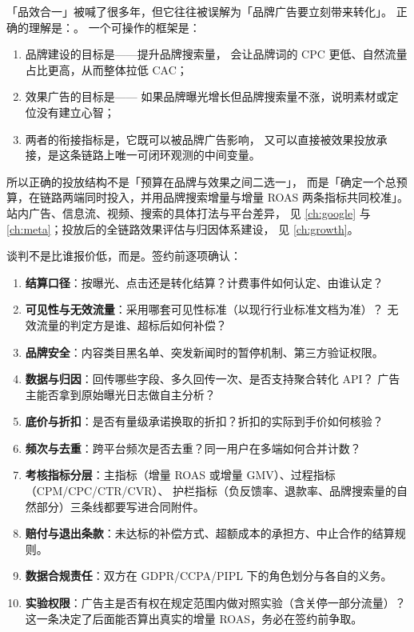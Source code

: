 \begin{insight}[品效协同的真实含义]
「品效合一」被喊了很多年，但它往往被误解为「品牌广告要立刻带来转化」。
正确的理解是：。
一个可操作的框架是：
\begin{enumerate}
  \item 品牌建设的目标是——提升品牌搜索量，
        会让品牌词的 CPC 更低、自然流量占比更高，从而整体拉低 CAC；
  \item 效果广告的目标是——
        如果品牌曝光增长但品牌搜索量不涨，说明素材或定位没有建立心智；
  \item 两者的衔接指标是，它既可以被品牌广告影响，
        又可以直接被效果投放承接，是这条链路上唯一可闭环观测的中间变量。
\end{enumerate}
所以正确的投放结构不是「预算在品牌与效果之间二选一」，
而是「确定一个总预算，在链路两端同时投入，并用品牌搜索增量与增量 ROAS 两条指标共同校准」。
站内广告、信息流、视频、搜索的具体打法与平台差异，
见 \cref{ch:google} 与 \cref{ch:meta}；投放后的全链路效果评估与归因体系建设，
见 \cref{ch:growth}。
\end{insight}

\begin{toolbox}[媒体采购的谈判与考核指标清单]
谈判不是比谁报价低，而是。签约前逐项确认：
\begin{enumerate}
  \item \textbf{结算口径}：按曝光、点击还是转化结算？计费事件如何认定、由谁认定？
  \item \textbf{可见性与无效流量}：采用哪套可见性标准（以现行行业标准文档为准）？
        无效流量的判定方是谁、超标后如何补偿？
  \item \textbf{品牌安全}：内容类目黑名单、突发新闻时的暂停机制、第三方验证权限。
  \item \textbf{数据与归因}：回传哪些字段、多久回传一次、是否支持聚合转化 API？
        广告主能否拿到原始曝光日志做自主分析？
  \item \textbf{底价与折扣}：是否有量级承诺换取的折扣？折扣的实际到手价如何核验？
  \item \textbf{频次与去重}：跨平台频次是否去重？同一用户在多端如何合并计数？
  \item \textbf{考核指标分层}：主指标（增量 ROAS 或增量 GMV）、过程指标（CPM/CPC/CTR/CVR）、
        护栏指标（负反馈率、退款率、品牌搜索量的自然部分）三条线都要写进合同附件。
  \item \textbf{赔付与退出条款}：未达标的补偿方式、超额成本的承担方、中止合作的结算规则。
  \item \textbf{数据合规责任}：双方在 GDPR/CCPA/PIPL 下的角色划分与各自的义务。
  \item \textbf{实验权限}：广告主是否有权在规定范围内做对照实验（含关停一部分流量）？
        这一条决定了后面能否算出真实的增量 ROAS，务必在签约前争取。
\end{enumerate}
\end{toolbox}

